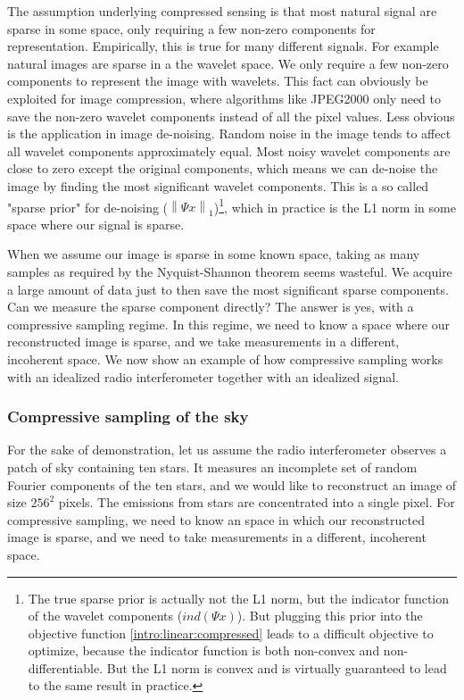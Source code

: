 The assumption underlying compressed sensing is that most natural signal are sparse in some space, only requiring a few non-zero components for representation. Empirically, this is true for many different signals. For example natural images are sparse in a the wavelet space. We only require a few non-zero components to represent the image with wavelets. This fact can obviously be exploited for image compression, where algorithms like JPEG2000 only need to save the non-zero wavelet components instead of all the pixel values. Less obvious is the application in image de-noising. Random noise in the image tends to affect all wavelet components approximately equal. Most noisy wavelet components are close to zero except the original components, which means we can de-noise the image by finding the most significant wavelet components. This is a so called "sparse prior" for de-noising  ($\left \|\Psi x \right \|_1$)\footnote{The true sparse prior is actually not the L1 norm, but the indicator function of the wavelet components ($ind(\Psi x)$). But plugging this prior into the objective function \eqref{intro:linear:compressed} leads to a difficult objective to optimize, because the indicator function is both non-convex and non-differentiable. But the L1 norm is convex and is virtually guaranteed to lead to the same result in practice\cite{lustig2008compressed}.}, which in practice is the L1 norm in some space where our signal is sparse. 

When we assume our image is sparse in some known space, taking as many samples as required by the Nyquist-Shannon theorem seems wasteful. We acquire a large amount of data just to then save the most significant sparse components. Can we measure the sparse component directly? The answer is yes, with a compressive sampling regime. In this regime, we need to know a space where our reconstructed image is sparse, and we take measurements in a different, incoherent space. We now show an example of how compressive sampling works with an idealized radio interferometer together with an idealized signal.

\subsubsection{Compressive sampling of the sky}
For the sake of demonstration, let us assume the radio interferometer observes a patch of sky containing ten stars. It measures an incomplete set of random Fourier components of the ten stars, and we would like to reconstruct an image of size $256^2$ pixels. The emissions from stars are concentrated into a single pixel. For compressive sampling, we need to know an space in which our reconstructed image is sparse, and we need to take measurements in a different, incoherent space.

